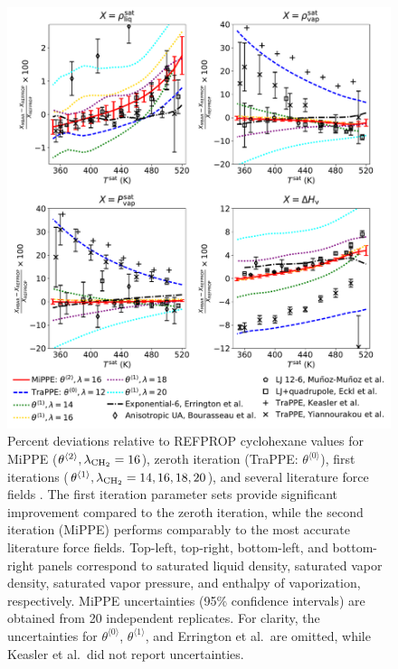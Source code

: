 \documentclass[journal=jced,manuscript=article]{achemso}
\begin{document}


	\begin{figure}[H]
		\centering
		\includegraphics[width=5.8in]{CYC6_deviations_iterations.pdf}
		\caption{Percent deviations relative to REFPROP cyclohexane values\cite{Zhou2014} for MiPPE ($\theta^{\langle2\rangle}, \lambda_{\rm CH_2} = 16$), zeroth iteration (TraPPE: $\theta^{\langle0\rangle}$), first iterations ($\theta^{\langle1\rangle}, \lambda_{\rm CH_2} = 14, 16, 18, 20$), and several literature force fields \cite{Errington1999,Eckl2008,Bourasseau2002CYC6,Mauricio2015,Keasler2012,Yiannourakou2019}. The first iteration parameter sets provide significant improvement compared to the zeroth iteration, while the second iteration (MiPPE) performs comparably to the most accurate literature force fields. Top-left, top-right, bottom-left, and bottom-right panels correspond to saturated liquid density, saturated vapor density, saturated vapor pressure, and enthalpy of vaporization, respectively. MiPPE uncertainties (95\% confidence intervals) are obtained from 20 independent replicates. For clarity, the uncertainties for $\theta^{\langle0\rangle}$, $\theta^{\langle1\rangle}$, and Errington et al.~\cite{Errington1999}are omitted, while Keasler et al.~\cite{Keasler2012}did not report uncertainties.}
		\label{fig: VLE cyclohexane}
	\end{figure}
\end{document}
